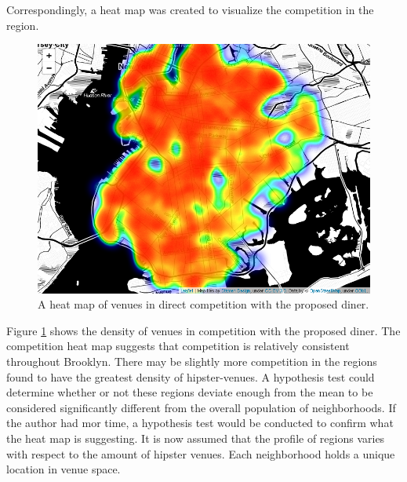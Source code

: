 \documentclass[12pt]{article}
\begin{document}
	Correspondingly, a heat map was created to visualize the competition in the region.
\begin{figure}[H]
  \includegraphics[width=6.5in]{comp_heatmap.png}
  \caption{A heat map of venues in direct competition with the proposed diner.}
  \label{fig:comp_heatmap}
\end{figure}
	Figure \ref{fig:comp_heatmap} shows the density of venues in competition with the proposed diner.
	The competition heat map suggests that competition is relatively consistent throughout Brooklyn.
	There may be slightly more competition in the regions found to have the greatest density of hipster-venues.
	A hypothesis test could determine whether or not these regions deviate enough from the mean to be considered significantly different from the overall population of neighborhoods.
	If the author had mor time, a hypothesis test would be conducted to confirm what the heat map is suggesting.
	It is now assumed that the profile of regions varies with respect to the amount of hipster venues.
	Each neighborhood holds a unique location in venue space.
\end{document}
